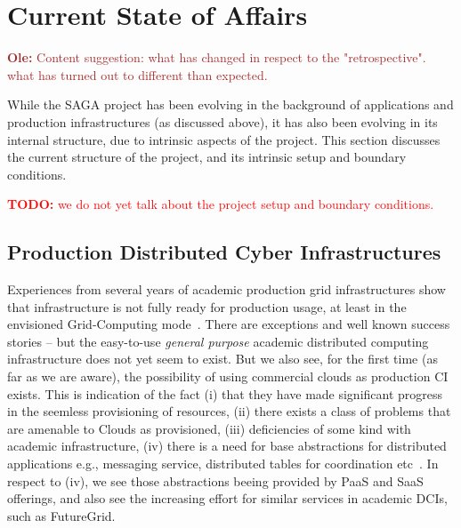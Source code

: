 \documentclass{article}
\newcommand{\I}[1]{\textit{#1}}
\newcommand{\B}[1]{\textbf{#1}}
\newcommand{\todo}[1]{{\textcolor{red}{\B{TODO:} #1 }}}
\newcommand{\ownote}[1]{{\textcolor{Brown}{   \B{Ole:     } #1 }}}
\newcommand{\todo}[1]{}
\newcommand{\ownote}[1]{}
\begin{document}

\section{Current State of Affairs}
\label{sec:state}

 \ownote{Content suggestion: what has changed in respect to the
 "retrospective". what has turned out to different than expected.}

While the SAGA project has been evolving in the background of
applications and production infrastructures (as discussed above), it
has also been evolving in its internal structure, due to intrinsic
aspects of the project.  This section discusses the current structure
of the project, and its intrinsic setup and boundary conditions.

\todo{we do not yet talk about the project setup and boundary
  conditions.}


 \subsection{Production Distributed Cyber Infrastructures}
 \label{ssec:state:dci}
  
  Experiences from several years of academic production grid
  infrastructures show that infrastructure is not fully ready for
  production usage, at least in the envisioned Grid-Computing
  mode~\cite{xsede_req,dpa-pdci-tr}.  There are exceptions and well
  known success stories -- but the easy-to-use \I{general purpose}
  academic distributed computing infrastructure does not yet seem to
  exist.  But we also see, for the first time (as far as we are
  aware), the possibility of using commercial clouds as production CI
  exists. This is indication of the fact (i) that they have made
  significant progress in the seemless provisioning of resources, (ii)
  there exists a class of problems that are amenable to Clouds as
  provisioned, (iii) deficiencies of some kind with academic
  infrastructure, (iv) there is a need for base abstractions for
  distributed applications e.g., messaging service, distributed tables
  for coordination etc~\cite{1542058}.  In respect to (iv), we see
  those abstractions beeing provided by PaaS and SaaS offerings, and
  also see the increasing effort for similar services in academic
  DCIs, such as FutureGrid.
\end{document}
